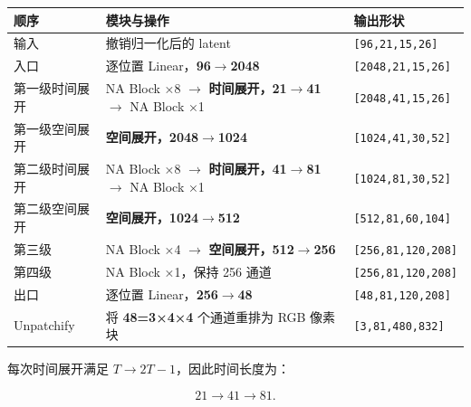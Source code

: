 \documentclass[
  11pt,
  a4paper,
  fontset=none]{ctexart}
\newcounter{none} %
\begin{document}
{\def\LTcaptype{none} %
\begin{longtable}[]{@{}
  >{\raggedright\arraybackslash}p{}
  >{\raggedright\arraybackslash}p{}
  >{\raggedright\arraybackslash}p{}@{}}
\toprule\noalign{}
\begin{minipage}[b]{\linewidth}\raggedright
顺序
\end{minipage} & \begin{minipage}[b]{\linewidth}\raggedright
模块与操作
\end{minipage} & \begin{minipage}[b]{\linewidth}\raggedright
输出形状
\end{minipage} \\
\midrule\noalign{}
\endhead
\bottomrule\noalign{}
\endlastfoot
输入 & 撤销归一化后的 latent & \texttt{{[}96,21,15,26{]}} \\
入口 & 逐位置 Linear，\textbf{96\(\rightarrow\)2048} &
\texttt{{[}2048,21,15,26{]}} \\
第一级时间展开 & NA Block ×8 \(\rightarrow\)
\textbf{时间展开，21\(\rightarrow\)41} \(\rightarrow\) NA Block ×1 &
\texttt{{[}2048,41,15,26{]}} \\
第一级空间展开 & \textbf{空间展开，2048\(\rightarrow\)1024} &
\texttt{{[}1024,41,30,52{]}} \\
第二级时间展开 & NA Block ×8 \(\rightarrow\)
\textbf{时间展开，41\(\rightarrow\)81} \(\rightarrow\) NA Block ×1 &
\texttt{{[}1024,81,30,52{]}} \\
第二级空间展开 & \textbf{空间展开，1024\(\rightarrow\)512} &
\texttt{{[}512,81,60,104{]}} \\
第三级 & NA Block ×4 \(\rightarrow\)
\textbf{空间展开，512\(\rightarrow\)256} &
\texttt{{[}256,81,120,208{]}} \\
第四级 & NA Block ×1，保持 256 通道 & \texttt{{[}256,81,120,208{]}} \\
出口 & 逐位置 Linear，\textbf{256\(\rightarrow\)48} &
\texttt{{[}48,81,120,208{]}} \\
Unpatchify & 将 \textbf{48=3×4×4} 个通道重排为 RGB 像素块 &
\texttt{{[}3,81,480,832{]}} \\
\end{longtable}
}

\endgroup

每次时间展开满足 \textbf{\(T\rightarrow2T-1\)}，因此时间长度为：

\[
21\rightarrow41\rightarrow81.
\]
\end{document}
